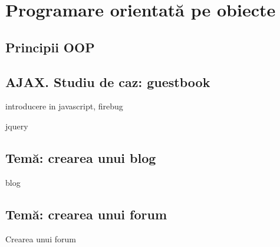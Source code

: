 \chapter{Programare orientată pe obiecte}
\section{Principii OOP}

\section{AJAX. Studiu de caz: guestbook}
introducere in javascript, firebug

jquery

\section{Temă: crearea unui blog}
blog
\section{Temă: crearea unui forum}
Crearea unui forum

